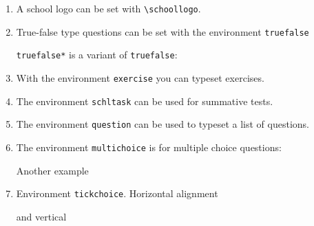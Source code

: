 \documentclass[12pt,a4page]{article}
\def\cellwidth{0.4\textwidth}
\newcommand{\miniexample}[3][t]{%
  \parbox[#1][#3][t]{\cellwidth}{#2}
}
\newcommand{\codeexample}[3][c]{%
  \colorbox[HTML]{b0c4be}{\miniexample[#1]{}{#3}}
}
\newcommand{\textexample}[3][c]{%
  {\footnotesize
    \colorbox[gray]{0.9}{\miniexample[#1]{}{#3}}%
  }
}
\newcommand{\examplerow}[3][10pt]{%
  \par\noindent\strut\hfill\codeexample{#2}{#3}\hspace{#1}\textexample{#2}{#3}\hfill\strut
}
\newlength{\exheight}
\begin{document}
\begin{enumerate}
  \newpage

\item A school logo can be set with \verb|\schoollogo|.
  \setlength{\exheight}{62pt}
  \examplerow{exampleMacroSchoollogo.tex}{\exheight}
\item True-false type questions can be set with the environment \verb|truefalse|\\
  \setlength{\exheight}{85pt}
  \setlength{\truefalselength}{20pt}
  \examplerow{exampleEnvirTruefalse01.tex}{\exheight}
\noindent \verb|truefalse*| is a variant of \verb|truefalse|:
\setlength{\exheight}{95pt}
\setlength{\truefalselength}{30pt} 
\examplerow{exampleEnvirTruefalse02.tex}{\exheight}
\item With the environment \texttt{exercise} you can typeset exercises.
  \setlength{\exheight}{193pt}
  \examplerow{exampleEnvirExercise.tex}{\exheight}

  \newpage

\item The environment \texttt{schltask} can be used for summative tests.
  \setlength{\exheight}{86pt}
  \examplerow{exampleEnvirSchltask.tex}{\exheight}
\item The environment \verb|question| can be used to typeset a list of questions.
  \setlength{\exheight}{61pt}
  \examplerow{exampleEnvirQuestion.tex}{\exheight}
\item The environment \verb|multichoice| is for multiple choice questions:
  \setlength{\exheight}{72pt}
  \examplerow{exampleEnvirMultichoice01.tex}{\exheight}

  Another example
  \setlength{\exheight}{85pt}
  \examplerow{exampleEnvirMultichoice02.tex}{\exheight}
\item Environment \texttt{tickchoice}. Horizontal alignment
  \setlength{\exheight}{60pt}
  \examplerow{exampleEnvirTickchoice01.tex}{\exheight}

  and vertical

  \setlength{\exheight}{60pt}
  \examplerow{exampleEnvirTickchoice02.tex}{\exheight}
\end{enumerate}
\end{document}
